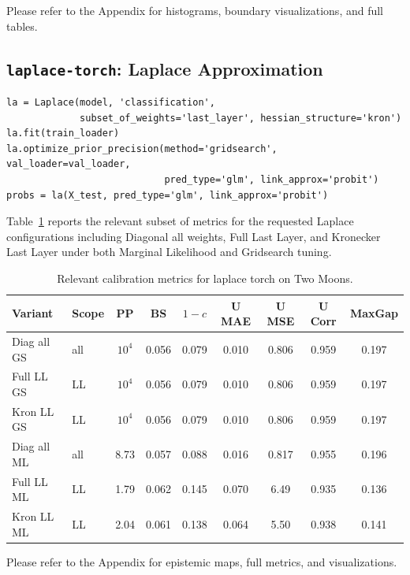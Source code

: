 \documentclass[conference]{IEEEtran}
\begin{document}
Please refer to the Appendix for histograms, boundary visualizations, and full tables.

\subsection{\texttt{laplace-torch}: Laplace Approximation}
\label{sec:la}

\begin{lstlisting}[caption={Laplace post hoc workflow.}]
la = Laplace(model, 'classification',
             subset_of_weights='last_layer', hessian_structure='kron')
la.fit(train_loader)
la.optimize_prior_precision(method='gridsearch', val_loader=val_loader,
                            pred_type='glm', link_approx='probit')
probs = la(X_test, pred_type='glm', link_approx='probit')
\end{lstlisting}

Table~\ref{tab:la_main_subset} reports the relevant subset of metrics for the requested Laplace configurations including Diagonal all weights, Full Last Layer, and Kronecker Last Layer under both Marginal Likelihood and Gridsearch tuning.

\begin{table}[H]
  \centering
  \caption{Relevant calibration metrics for laplace torch on Two Moons.}
  \label{tab:la_main_subset}
  \small\setlength{\tabcolsep}{4pt}
  \begin{tabular}{llccccccc}
    \toprule
    Variant & Scope & PP & BS & $1 - c$ & U MAE & U MSE & U Corr & MaxGap \\
    \midrule
    Diag all GS & all & $10^4$ & 0.056 & 0.079 & 0.010 & 0.806 & 0.959 & 0.197 \\
    Full LL GS  & LL  & $10^4$ & 0.056 & 0.079 & 0.010 & 0.806 & 0.959 & 0.197 \\
    Kron LL GS  & LL  & $10^4$ & 0.056 & 0.079 & 0.010 & 0.806 & 0.959 & 0.197 \\
    Diag all ML & all & 8.73  & 0.057 & 0.088 & 0.016 & 0.817 & 0.955 & 0.196 \\
    Full LL ML  & LL  & 1.79  & 0.062 & 0.145 & 0.070 & 6.49  & 0.935 & 0.136 \\
    Kron LL ML  & LL  & 2.04  & 0.061 & 0.138 & 0.064 & 5.50  & 0.938 & 0.141 \\
    \bottomrule
  \end{tabular}
\end{table}

Please refer to the Appendix for epistemic maps, full metrics, and visualizations.
\end{document}

